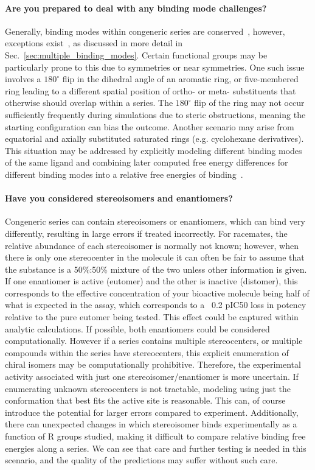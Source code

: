 \documentclass[9pt,bestpractices]{livecoms}
\begin{document}
\paragraph{Are you prepared to deal with any binding mode challenges?}
Generally, binding modes within congeneric series are conserved~\cite{wacker2010conserved}, however, exceptions exist~\cite{brandt2011congeneric,nazare2005probing}, as discussed in more detail in Sec.~\ref{sec:multiple_binding_modes}. Certain functional groups may be particularly prone to this due to symmetries or near symmetries. One such issue involves a $180^{\circ}$ flip in the dihedral angle of an aromatic ring, or five-membered ring leading to a different spatial position of ortho- or meta- substituents that otherwise should overlap within a series. The $180^{\circ}$ flip of the ring may not occur sufficiently frequently during simulations due to steric obstructions, meaning the  starting configuration can bias the outcome. Another scenario may arise from equatorial and axially substituted saturated rings (e.g. cyclohexane derivatives). This situation may be addressed by explicitly modeling different binding modes of the same ligand and combining later computed free energy differences for different binding modes into a relative free energies of binding~\cite{kaus2015how}.

\paragraph{Have you considered stereoisomers and enantiomers?}
Congeneric series can contain stereoisomers or enantiomers, which can bind very differently, resulting in large errors if treated incorrectly. For racemates, the relative abundance of each stereoisomer is normally not known; however, when there is only one stereocenter in the molecule it can often be fair to assume that the substance is a 50\%:50\% mixture of the two unless other information is given. If one enantiomer is active (eutomer) and the other is inactive (distomer), this corresponds to the effective concentration of your bioactive molecule being half of what is expected in the assay, which corresponds to a ~0.2 pIC50 loss in potency relative to the pure eutomer being tested. This effect could be captured within analytic calculations.\cite{h2011significance} If possible, both enantiomers could be considered computationally. However if a series contains multiple stereocenters, or multiple compounds within the series have stereocenters, this explicit enumeration of chiral isomers may be computationally prohibitive. Therefore, the experimental activity associated with just one stereoisomer/enantiomer is more uncertain. If enumerating unknown stereocenters is not tractable, modeling using just the conformation that best fits the active site is reasonable.  This can, of course introduce the potential for larger errors compared to experiment. Additionally, there can unexpected changes in which stereoisomer binds experimentally as a function of R groups studied, making it difficult to compare relative binding free energies along a series. We can see that care and further testing is needed in this scenario, and the quality of the predictions may suffer without such care. 
\end{document}
